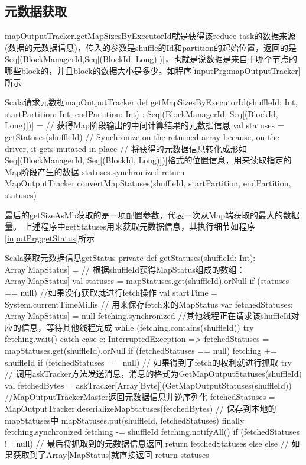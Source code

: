 \subsection{元数据获取}
mapOutputTracker.getMapSizesByExecutorId就是获得该reduce task的数据来源(数据的元数据信息)，传入的参数是shuffle的Id和partition的起始位置，返回的是Seq[(BlockManagerId,Seq[(BlockId, Long)])]，也就是说数据是来自于哪个节点的哪些block的，并且block的数据大小是多少。如程序\ref{inputPrg:mapOutputTracker}所示
\begin{codeInput}{Scala}{请求元数据}{mapOutputTracker}
def getMapSizesByExecutorId(shuffleId: Int, startPartition: Int, endPartition: Int)
: Seq[(BlockManagerId, Seq[(BlockId, Long)])] = {
  // 获得Map阶段输出的中间计算结果的元数据信息
  val statuses = getStatuses(shuffleId)
  // Synchronize on the returned array because, on the driver, it gets mutated in place
  // 将获得的元数据信息转化成形如Seq[(BlockManagerId, Seq[(BlockId, Long)])]格式的位置信息，用来读取指定的Map阶段产生的数据
  statuses.synchronized {
    return MapOutputTracker.convertMapStatuses(shuffleId, startPartition, endPartition, statuses)
  }
}
\end{codeInput}
最后的getSizeAsMb获取的是一项配置参数，代表一次从Map端获取的最大的数据量。
上述程序中getStatuses用来获取元数据信息，其执行细节如程序\ref{inputPrg:getStatus}所示
\begin{codeInput}{Scala}{获取元数据信息}{getStatus}
private def getStatuses(shuffleId: Int): Array[MapStatus] = {
  // 根据shuffleId获得MapStatus组成的数组：Array[MapStatus]
  val statuses = mapStatuses.get(shuffleId).orNull
  if (statuses == null) {
    //如果没有获取就进行fetch操作
    val startTime = System.currentTimeMillis
    // 用来保存fetch来的MapStatus
    var fetchedStatuses: Array[MapStatus] = null
    fetching.synchronized {
      //其他线程正在请求该shuffleId对应的信息，等待其他线程完成
      while (fetching.contains(shuffleId)) {
        try {
          fetching.wait()
        } catch {
          case e: InterruptedException =>
        }
      }		
      fetchedStatuses = mapStatuses.get(shuffleId).orNull
      if (fetchedStatuses == null) {
        fetching += shuffleId
      }
    }	
    if (fetchedStatuses == null) {
      // 如果得到了fetch的权利就进行抓取
      try {
        // 调用askTracker方法发送消息，消息的格式为GetMapOutputStatuses(shuffleId)
        val fetchedBytes = askTracker[Array[Byte]](GetMapOutputStatuses(shuffleId))
        //MapOutputTrackerMaster返回元数据信息并逆序列化
        fetchedStatuses = MapOutputTracker.deserializeMapStatuses(fetchedBytes)
        // 保存到本地的mapStatuses中
        mapStatuses.put(shuffleId, fetchedStatuses)
      } finally {
        fetching.synchronized {
        fetching -= shuffleId
        fetching.notifyAll()
        }
      }
    }
    if (fetchedStatuses != null) {
      // 最后将抓取到的元数据信息返回
      return fetchedStatuses
    } else {
    } 
  } else {
    // 如果获取到了Array[MapStatus]就直接返回
    return statuses
  }
}
\end{codeInput}
